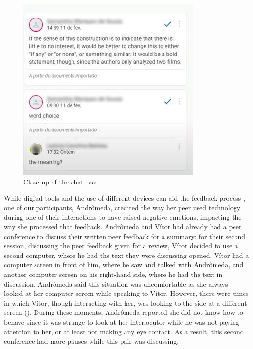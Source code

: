 \documentclass[english]{textolivre}
\begin{document}
\begin{figure}[h!]
\centering
\begin{minipage}{.8\textwidth}
 \includegraphics[width=\textwidth]{image3.jpg}
 \caption{Close up of the chat box}
 \label{fig4}
\end{minipage}
\end{figure}

While digital tools and the use of different devices can aid the feedback process \cite{bakla2020extensive, elola2017writing}, one of our participants, Andrômeda, credited the way her peer used technology during one of their interactions to have raised negative emotions, impacting the way she processed that feedback. Andrômeda and Vítor had already had a peer conference to discuss their written peer feedback for a summary; for their second session, discussing the peer feedback given for a review, Vítor decided to use a second computer, where he had the text they were discussing opened. Vítor had a computer screen in front of him, where he saw and talked with Andrômeda, and another computer screen on his right-hand side, where he had the text in discussion. Andrômeda said this situation was uncomfortable as she always looked at her computer screen while speaking to Vítor. However, there were times in which Vítor, though interacting with her, was looking to the side at a different screen (). During these moments, Andrômeda reported she did not know how to behave since it was strange to look at her interlocutor while he was not paying attention to her, or at least not making any eye contact. As a result, this second conference had more pauses while this pair was discussing.
\end{document}
